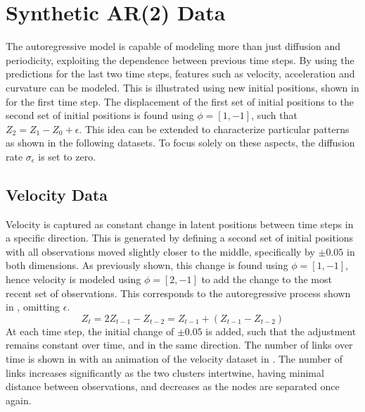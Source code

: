 \section{Synthetic AR(2) Data}
    
    The autoregressive model is capable of modeling more than just diffusion and periodicity, exploiting the dependence between previous time steps. By using the predictions for the last two time steps, features such as velocity, acceleration and curvature can be modeled. This is illustrated using new initial positions, shown in  for the first time step. 
    The displacement of the first set of initial positions to the second set of initial positions is found using $\phi=[1,-1]$, such that $Z_2 = Z_1 - Z_0 + \epsilon$. This idea can be extended to characterize particular patterns as shown in the following datasets. To focus solely on these aspects, the diffusion rate $\sigma_\epsilon$ is set to zero.
        
    \subsection{Velocity Data}
        
        Velocity is captured as constant change in latent positions between time steps in a specific direction. This is generated by defining a second set of initial positions with all observations moved slightly closer to the middle, specifically by $\pm0.05$ in both dimensions. As previously shown, this change is found using $\phi=[1,-1]$, hence velocity is modeled using $\phi=[2,-1]$ to add the change to the most recent set of observations. This corresponds to the autoregressive process shown in , omitting $\epsilon$.
        \begin{equation}\label{eq:data-velocity}
            Z_t = 2 Z_{t-1} - Z_{t-2} = Z_{t-1} + (Z_{t-1} - Z_{t-2})
        \end{equation}
        At each time step, the initial change of $\pm0.05$ is added, such that the adjustment remains constant over time, and in the same direction. The number of links over time is shown in  with an animation of the velocity dataset in .
        The number of links increases significantly as the two clusters intertwine, having minimal distance between observations, and decreases as the nodes are separated once again.
        
